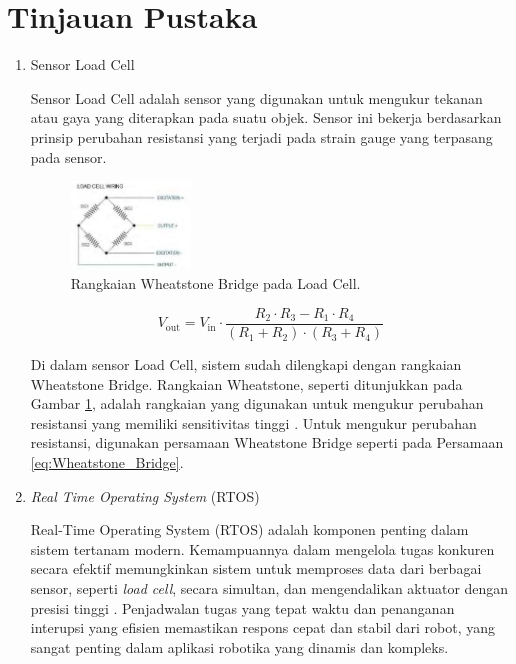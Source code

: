 \section{Tinjauan Pustaka}
\label{sec:tinjauanpustaka}

\begin{enumerate}[label=\Alph*.]
    \item Sensor Load Cell
    \label{subsec:sensorloadcell}

    \hspace*{1em} Sensor Load Cell adalah sensor yang digunakan untuk mengukur tekanan atau gaya yang diterapkan pada suatu objek. Sensor ini bekerja berdasarkan prinsip perubahan resistansi yang terjadi pada strain gauge yang terpasang pada sensor.

    \begin{figure}[h]
        \centering
        \includegraphics[width=0.3\textwidth]{./gambar/wheatstone_loadcell.png}
        \caption{Rangkaian Wheatstone Bridge pada Load Cell\cite{rahman2018autonomous}.}
        \label{fig:Wheatstone_Bridge}
    \end{figure}
    
    \begin{equation}
      V_{\mathrm{out}} = V_{\mathrm{in}} \cdot \frac{R_2 \cdot R_3 - R_1 \cdot R_4}{(R_1 + R_2) \cdot (R_3 + R_4)}
      \label{eq:Wheatstone_Bridge}
    \end{equation}
    
    \hspace*{1em} Di dalam sensor Load Cell, sistem sudah dilengkapi dengan rangkaian Wheatstone Bridge. Rangkaian Wheatstone, seperti ditunjukkan pada Gambar \ref{fig:Wheatstone_Bridge}, adalah rangkaian yang digunakan untuk mengukur perubahan resistansi yang memiliki sensitivitas tinggi \cite{rahman2018autonomous}. Untuk mengukur perubahan resistansi, digunakan persamaan Wheatstone Bridge seperti pada Persamaan \ref{eq:Wheatstone_Bridge}. 

    \item \textit{Real Time Operating System} (RTOS)
    \label{subsec:rtos}

    \hspace*{1em} Real-Time Operating System (RTOS) adalah komponen penting dalam sistem tertanam modern. Kemampuannya dalam mengelola tugas konkuren secara efektif memungkinkan sistem untuk memproses data dari berbagai sensor, seperti \emph{load cell}, secara simultan, dan mengendalikan aktuator dengan presisi tinggi \cite{sayyad2023real}. Penjadwalan tugas yang tepat waktu dan penanganan interupsi yang efisien memastikan respons cepat dan stabil dari robot, yang sangat penting dalam aplikasi robotika yang dinamis dan kompleks.


\end{enumerate}
